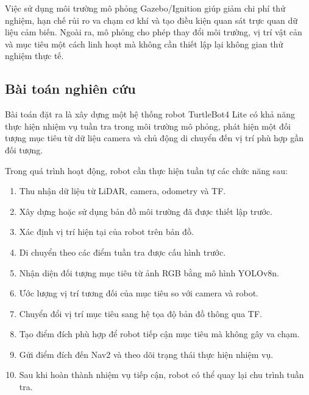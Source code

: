 Việc sử dụng môi trường mô phỏng Gazebo/Ignition giúp giảm chi phí thử nghiệm, hạn chế rủi ro va chạm cơ khí và tạo điều kiện quan sát trực quan dữ liệu cảm biến. Ngoài ra, mô phỏng cho phép thay đổi môi trường, vị trí vật cản và mục tiêu một cách linh hoạt mà không cần thiết lập lại không gian thử nghiệm thực tế.

\subsection{Bài toán nghiên cứu}

Bài toán đặt ra là xây dựng một hệ thống robot TurtleBot4 Lite có khả năng thực hiện nhiệm vụ tuần tra trong môi trường mô phỏng, phát hiện một đối tượng mục tiêu từ dữ liệu camera và chủ động di chuyển đến vị trí phù hợp gần đối tượng.

Trong quá trình hoạt động, robot cần thực hiện tuần tự các chức năng sau:

\begin{enumerate}
    \item Thu nhận dữ liệu từ LiDAR, camera, odometry và TF.
    
    \item Xây dựng hoặc sử dụng bản đồ môi trường đã được thiết lập trước.
    
    \item Xác định vị trí hiện tại của robot trên bản đồ.
    
    \item Di chuyển theo các điểm tuần tra được cấu hình trước.
    
    \item Nhận diện đối tượng mục tiêu từ ảnh RGB bằng mô hình YOLOv8n.
    
    \item Ước lượng vị trí tương đối của mục tiêu so với camera và robot.
    
    \item Chuyển đổi vị trí mục tiêu sang hệ tọa độ bản đồ thông qua TF.
    
    \item Tạo điểm đích phù hợp để robot tiếp cận mục tiêu mà không gây va chạm.
    
    \item Gửi điểm đích đến Nav2 và theo dõi trạng thái thực hiện nhiệm vụ.
    
    \item Sau khi hoàn thành nhiệm vụ tiếp cận, robot có thể quay lại chu trình tuần tra.
\end{enumerate}

